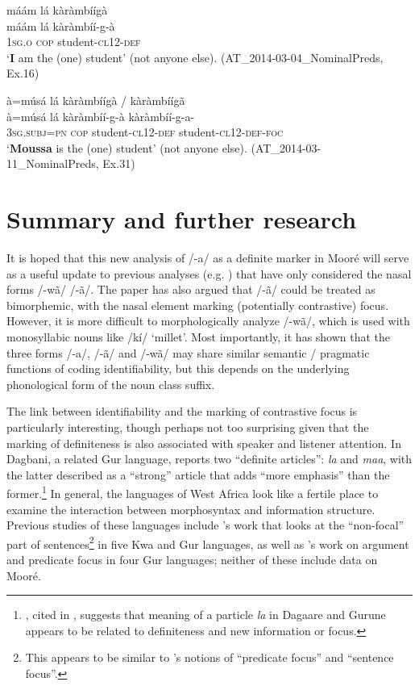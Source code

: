 \documentclass[output=paper]{langsci/langscibook}
\begin{document}
\ea\label{ex:teo:63}
\glll máám lá kàràmbíígà\\
máám lá kàràmbíí-g-à\\
\textsc{1sg.o} \textsc{cop} student-\textsc{cl12-def}\\
\glt ‘\textbf{I} am the (one) student’ (not anyone else). (AT\_2014-03-04\_NominalPreds, Ex.16)
\z

\ea\label{ex:teo:64}
\glll à=músá lá kàràmbíígà / kàràmbíígã \\
à=músá lá kàràmbíí-g-à kàràmbíí-g-a-{\Tilde}  \\
\textsc{3sg.subj=pn} \textsc{cop} student-\textsc{cl12-def} student-\textsc{cl12-def-foc}\\
\glt ‘\textbf{Mo}\textbf{ussa} is the (one) student’ (not anyone else). (AT\_2014-03-11\_NominalPreds, Ex.31)
\z

\section{Summary and further research}\label{sec:teo:8}

It is hoped that this new analysis of /-a/ as a definite marker in Mooré will serve as a useful update to previous analyses (e.g. \citealt{Peterson1971,canu1974}) that have only considered the nasal forms /-wã/ {\Tilde} /-ã/. The paper has also argued that /-ã/ could be treated as bimorphemic, with the nasal element marking (potentially contrastive) focus. However, it is more difficult to morphologically analyze /-wã/, which is used with monosyllabic nouns like /kí/ ‘millet’. Most importantly, it has shown that the three forms /-a/, /-ã/ and /-wã/ may share similar semantic / pragmatic functions of coding identifiability, but this depends on the underlying phonological form of the noun class suffix.

The link between identifiability and the marking of contrastive focus is particularly interesting, though perhaps not too surprising given that the marking of definiteness is also associated with speaker and listener attention. In Dagbani, a related Gur language, \citet[40]{Olawsky1999} reports two “definite articles”: \textit{la} and \textit{maa}, with the latter described as a “strong” article that adds “more emphasis” than the former.\footnote{\cite{KroppDakubu1991}, cited in \citet[30]{Olawsky1999}, suggests that meaning of a particle \textit{la} in Dagaare and Gurune appears to be related to definiteness and new information or focus.} In general, the languages of West Africa look like a fertile place to examine the interaction between morphosyntax and information structure. Previous studies of these languages include \cite{FiedlerSchwarz2005}'s work that looks at the “non-focal” part of sentences\footnote{This appears to be similar to \cite{Lambrecht1994}'s notions of “predicate focus” and “sentence focus”.} in five Kwa and Gur languages, as well as \cite{Schwarz2010gur}'s work on argument and predicate focus in four Gur languages; neither of these include data on Mooré.
\end{document}
